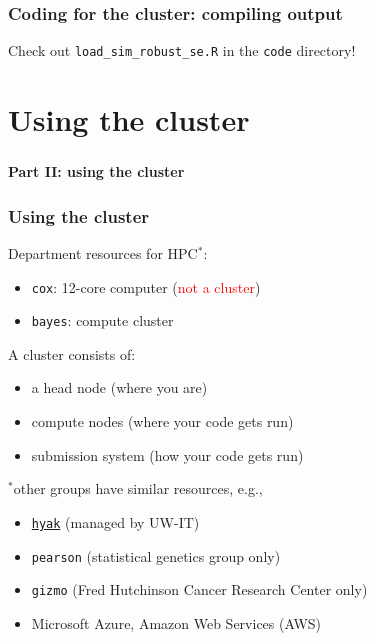 \documentclass[12pt, 
hyperref={colorlinks=true, linkcolor=BlueViolet, urlcolor=BlueViolet},dvipsnames]{beamer}
\begin{document}
\begin{frame}
\frametitle{Coding for the cluster: compiling output}

Check out \texttt{load\_sim\_robust\_se.R} in the \texttt{code} directory!

\end{frame}

\section{Using the cluster}
\begin{frame}
\frametitle{}
\begin{center}
{\large \textbf{Part II: using the cluster}}
\end{center}
\end{frame}

\begin{frame}
\frametitle{Using the cluster}
Department resources for HPC${}^*$: \vspace{-0.3cm} \pause
\begin{itemize}
\item \texttt{cox}: 12-core computer \pause (\textcolor{red}{not a cluster}) \pause
\item \texttt{bayes}: compute cluster
\end{itemize}

A cluster consists of: \vspace{-0.3cm} \pause
\begin{itemize}
\item a head node \pause (where you are) \pause
\item compute nodes \pause (where your code gets run) \pause
\item submission system \pause (how your code gets run) \pause
\end{itemize}

{\small ${}^*$other groups have similar resources, e.g., \vspace{-0.3cm}
\begin{itemize}
\item \href{https://itconnect.uw.edu/service/shared-scalable-compute-cluster-for-research-hyak/}{\texttt{hyak}} (managed by UW-IT)
\item \texttt{pearson} (statistical genetics group only)
\item \texttt{gizmo} (Fred Hutchinson Cancer Research Center only)
\item Microsoft Azure, Amazon Web Services (AWS)
\end{itemize}
}
\end{frame}
\end{document}
